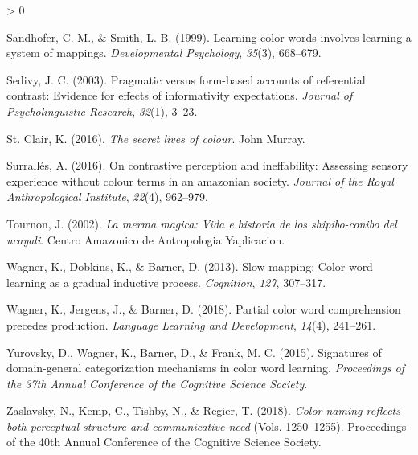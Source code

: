 \documentclass[
  english,
  ,apa7,floatsintext]{apa6}
\newlength{\cslhangindent}
\newenvironment{CSLReferences}[2] %
 {%
  \setlength{\parindent}{0pt}
  \ifodd #1 \everypar{\setlength{\hangindent}{\cslhangindent}}\ignorespaces\fi
  \ifnum #2 > 0
  \setlength{\parskip}{#2\baselineskip}
  \fi
 }%
 {}
\begin{document}
\begin{CSLReferences}{1}{0}
\leavevmode\hypertarget{ref-sandhofer1999}{}%
Sandhofer, C. M., \& Smith, L. B. (1999). Learning color words involves learning a system of mappings. \emph{Developmental Psychology}, \emph{35}(3), 668--679.

\leavevmode\hypertarget{ref-sedivy2003}{}%
Sedivy, J. C. (2003). Pragmatic versus form-based accounts of referential contrast: Evidence for effects of informativity expectations. \emph{Journal of Psycholinguistic Research}, \emph{32}(1), 3--23.

\leavevmode\hypertarget{ref-stclair2016}{}%
St. Clair, K. (2016). \emph{The secret lives of colour}. John Murray.

\leavevmode\hypertarget{ref-surralles2016}{}%
Surrallés, A. (2016). On contrastive perception and ineffability: Assessing sensory experience without colour terms in an amazonian society. \emph{Journal of the Royal Anthropological Institute}, \emph{22}(4), 962--979.

\leavevmode\hypertarget{ref-tournon2002}{}%
Tournon, J. (2002). \emph{La merma magica: Vida e historia de los shipibo-conibo del ucayali}. Centro Amazonico de Antropologia Yaplicacion.

\leavevmode\hypertarget{ref-wagner2013}{}%
Wagner, K., Dobkins, K., \& Barner, D. (2013). Slow mapping: Color word learning as a gradual inductive process. \emph{Cognition}, \emph{127}, 307--317.

\leavevmode\hypertarget{ref-wagner2018}{}%
Wagner, K., Jergens, J., \& Barner, D. (2018). Partial color word comprehension precedes production. \emph{Language Learning and Development}, \emph{14}(4), 241--261.

\leavevmode\hypertarget{ref-yurovsky2015}{}%
Yurovsky, D., Wagner, K., Barner, D., \& Frank, M. C. (2015). Signatures of domain-general categorization mechanisms in color word learning. \emph{Proceedings of the 37th Annual Conference of the Cognitive Science Society}.

\leavevmode\hypertarget{ref-zaslavsky2018}{}%
Zaslavsky, N., Kemp, C., Tishby, N., \& Regier, T. (2018). \emph{Color naming reflects both perceptual structure and communicative need} (Vols. 1250--1255). Proceedings of the 40th Annual Conference of the Cognitive Science Society.

\end{CSLReferences}

\endgroup
\end{document}
